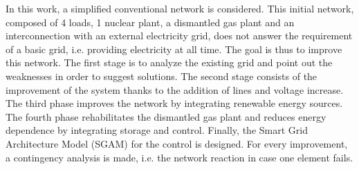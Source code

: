 In this work, a simplified conventional network is considered. This initial network, composed of 4 loads, 1 nuclear plant, a dismantled gas plant and an interconnection with an external electricity grid, does not answer the requirement of a basic grid, i.e. providing electricity at all time. The goal is thus to improve this network. The first stage is to analyze the existing grid and point out the weaknesses in order to suggest solutions. The second stage consists of the improvement of the system thanks to the addition of lines and voltage increase. The third phase improves the network by integrating renewable energy sources. The fourth phase rehabilitates the dismantled gas plant and reduces energy dependence by integrating storage and control. Finally, the Smart Grid Architecture Model (SGAM) for the control is designed. For every improvement, a contingency analysis is made, i.e. the network reaction in case one element fails. 

